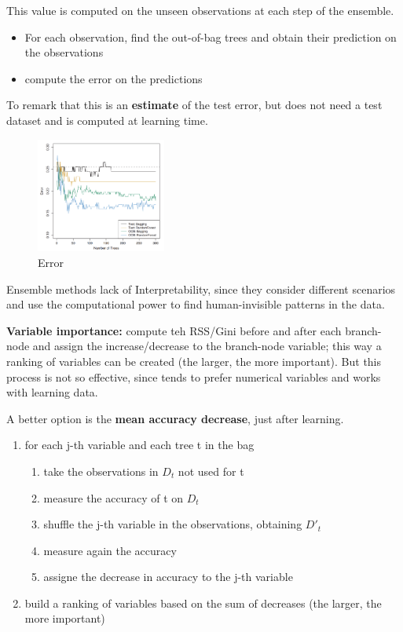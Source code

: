 \begin{definitionblock}
    This value is computed on the unseen observations at each step of the ensemble.
    \begin{itemize}
        \item For each observation, find the out-of-bag trees and obtain their prediction on the observations
        \item compute the error on the predictions 
    \end{itemize}
    To remark that this is an \textbf{estimate} of the test error, but does not need a test dataset and is computed at learning time.
\end{definitionblock}

\begin{figure}[H]
    \centering 
    \includegraphics[width=0.38\textwidth]{assets/fig24.png}
    \caption{Error}
\end{figure}
    
\begin{warningblock}[Interpretability]
    Ensemble methods lack of Interpretability, since they consider different scenarios and use the computational power to find human-invisible patterns in the data.
\end{warningblock}

\textbf{Variable importance:} compute teh RSS/Gini before and after each branch-node and assign the increase/decrease to the branch-node variable; this way a ranking of variables can be created (the larger, the more important).
But this process is not so effective, since tends to prefer numerical variables and works with learning data. 

A better option is the \textbf{mean accuracy decrease}, just after learning.
\begin{enumerate}
    \item for each j-th variable and each tree t in the bag 
    \begin{enumerate}
        \item take the observations in $D_t$ not used for t 
        \item measure the accuracy of t on $D_t$
        \item shuffle the j-th variable in the observations, obtaining $D'_t$
        \item measure again the accuracy 
        \item assigne the decrease in accuracy to the j-th variable 
    \end{enumerate}
    \item build a ranking of variables based on the sum of decreases (the larger, the more important)
\end{enumerate}

